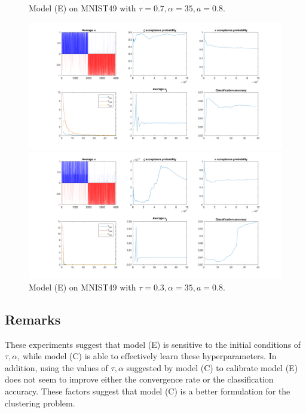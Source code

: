 \documentclass{siamart1116}
\begin{document}
        \begin{figure}[!htb]
            \begin{minipage}{0.48\textwidth}
                \centering
                \caption{\label{fig:model_e_mnist_t=0.7}Model (E) on MNIST49 with $\tau=0.7,\alpha=35,a=0.8$.}
                \includegraphics[width=\linewidth]{model_c_vs_model_e/mnist/learn_v/t=0_7.png}
            \end{minipage} \hfill
            \begin{minipage}{0.48\textwidth}
            \centering
            \caption{\label{fig:model_e_mnist_t=0.3}Model (E) on MNIST49 with $\tau=0.3,\alpha=35,a=0.8$.}
            \includegraphics[width=\linewidth]{model_c_vs_model_e/mnist/learn_v/t=0_3.png}
            \end{minipage}
        \end{figure}

        

    \subsection{Remarks}
        These experiments suggest that model (E) is sensitive to the initial conditions of $\tau, \alpha$, while model (C) is able to effectively learn these hyperparameters. In addition, using the values of $\tau, \alpha$ suggested by model (C) to calibrate model (E) does not seem to improve either the convergence rate or the classification accuracy. These factors suggest that model (C) is a better formulation for the clustering problem.
\end{document}
